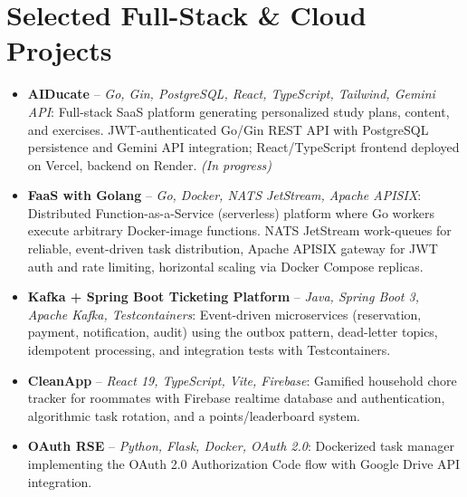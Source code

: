 \documentclass[11pt,a4paper,sans]{moderncv}
\begin{document}

\section{Selected Full-Stack \& Cloud Projects}
\vspace{1pt}
\begin{itemize}

\item \textbf{AIDucate} -- \textit{Go, Gin, PostgreSQL, React, TypeScript, Tailwind, Gemini API}: Full-stack SaaS platform generating personalized study plans, content, and exercises. JWT-authenticated Go/Gin REST API with PostgreSQL persistence and Gemini API integration; React/TypeScript frontend deployed on Vercel, backend on Render. \textit{(In progress)}

\item \textbf{FaaS with Golang} -- \textit{Go, Docker, NATS JetStream, Apache APISIX}: Distributed Function-as-a-Service (serverless) platform where Go workers execute arbitrary Docker-image functions. NATS JetStream work-queues for reliable, event-driven task distribution, Apache APISIX gateway for JWT auth and rate limiting, horizontal scaling via Docker Compose replicas.

\item \textbf{Kafka + Spring Boot Ticketing Platform} -- \textit{Java, Spring Boot 3, Apache Kafka, Testcontainers}: Event-driven microservices (reservation, payment, notification, audit) using the outbox pattern, dead-letter topics, idempotent processing, and integration tests with Testcontainers.

\item \textbf{CleanApp} -- \textit{React 19, TypeScript, Vite, Firebase}: Gamified household chore tracker for roommates with Firebase realtime database and authentication, algorithmic task rotation, and a points/leaderboard system.

\item \textbf{OAuth RSE} -- \textit{Python, Flask, Docker, OAuth 2.0}: Dockerized task manager implementing the OAuth 2.0 Authorization Code flow with Google Drive API integration.

\end{itemize}

\end{document}
